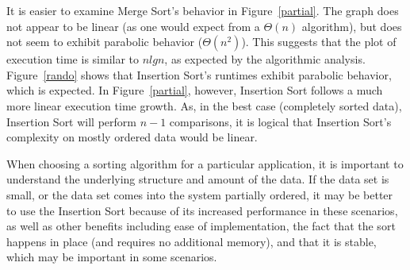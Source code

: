 \documentclass[10pt, letterpaper]{article}
\begin{document}
	It is easier to examine Merge Sort's behavior in Figure~\ref{partial}.  The graph does not appear to be linear (as one would expect from a $\Theta(n)$ algorithm), but does not seem to exhibit parabolic behavior ($\Theta(n^2)$).  This suggests that the plot of execution time is similar to $nlgn$, as expected by the algorithmic analysis.  Figure~\ref{rando} shows that Insertion Sort's runtimes exhibit parabolic behavior, which is expected.  In Figure~\ref{partial}, however, Insertion Sort follows a much more linear execution time growth.  As, in the best case (completely sorted data), Insertion Sort will perform $n-1$ comparisons, it is logical that Insertion Sort's complexity on mostly ordered data would be linear.
	
	When choosing a sorting algorithm for a particular application, it is important to understand the underlying structure and amount of the data.  If the data set is small, or the data set comes into the system partially ordered, it may be better to use the Insertion Sort because of its increased performance in these scenarios, as well as other benefits including ease of implementation, the fact that the sort happens in place (and requires no additional memory), and that it is stable, which may be important in some scenarios.  
\end{document}
